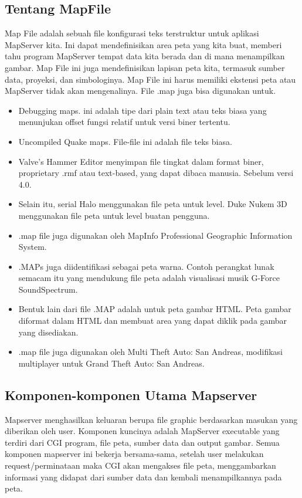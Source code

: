 \subsection{Tentang MapFile}
Map File adalah sebuah file konfigurasi teks terstruktur untuk aplikasi MapServer kita. Ini dapat mendefinisikan area peta yang kita buat, 
memberi tahu program MapServer tempat data kita berada dan di mana menampilkan gambar. 
Map File ini juga mendefinisikan lapisan peta kita, termasuk sumber data, proyeksi, dan simbologinya. 
Map File ini harus memiliki ekstensi peta atau MapServer tidak akan mengenalinya.
File .map juga bisa digunakan untuk.

\begin{itemize}
	\item Debugging maps. ini adalah tipe dari plain text atau teks biasa yang menunjukan offset fungsi relatif untuk versi biner tertentu.
	\item Uncompiled Quake maps. File-file ini adalah file teks biasa.
	\item Valve's Hammer Editor menyimpan file tingkat dalam format biner, proprietary .rmf atau text-based, yang dapat dibaca manusia. Sebelum versi 4.0.
	\item Selain itu, serial Halo menggunakan file peta untuk level. Duke Nukem 3D menggunakan file peta untuk level buatan pengguna.
	\item .map file juga digunakan oleh MapInfo Professional Geographic Information System.
	\item .MAPs juga diidentifikasi sebagai peta warna. Contoh perangkat lunak semacam itu yang mendukung file peta adalah visualisasi musik G-Force SoundSpectrum.
	\item Bentuk lain dari file .MAP adalah untuk peta gambar HTML. Peta gambar diformat dalam HTML dan membuat area yang dapat diklik pada gambar yang disediakan.
	\item .map file juga digunakan oleh Multi Theft Auto: San Andreas, modifikasi multiplayer untuk Grand Theft Auto: San Andreas.
\end{itemize}

\subsection{Komponen-komponen Utama Mapserver}
Mapserver menghasilkan keluaran berupa file graphic berdasarkan masukan yang diberikan oleh user. Komponen kuncinya adalah MapServer executable yang terdiri dari CGI program, file peta, sumber data dan output gambar. Semua komponen mapserver ini bekerja bersama-sama, setelah user melakukan request/perminataan maka CGI akan mengakses file peta, menggambarkan informasi yang didapat dari sumber data dan kembali menampilkannya pada peta.

